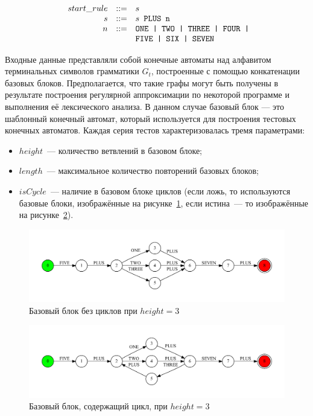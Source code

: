 $$
\begin{array}{crcl}
& start\_rule &::=& s \\
& s & ::= & s \mbox{\texttt{ PLUS }} \mbox{\texttt{n}}\\
& n & ::= & \mbox{\texttt{ONE | }} \mbox{\texttt{TWO | }} \mbox{\texttt{THREE | }} \mbox{\texttt{FOUR | }} \\
&   &     & \mbox{\texttt{FIVE | }} \mbox{\texttt{SIX | }} \mbox{\texttt{SEVEN}}
\end{array}
$$

Входные данные представляли собой конечные автоматы над алфавитом терминальных символов грамматики $G_t$, построенные с помощью конкатенации базовых блоков. Предполагается, что такие графы могут быть получены в результате построения регулярной аппроксимации по некоторой программе и выполнения её лексического анализа. В данном случае базовый блок --- это шаблонный конечный автомат, который используется для построения тестовых конечных автоматов. Каждая серия тестов характеризовалась тремя параметрами: 

\begin{itemize}
  \item $height$~--- количество ветвлений в базовом блоке;
  \item $length$~--- максимальное количество повторений базовых блоков;
  \item $isCycle$~--- наличие в базовом блоке циклов (если ложь, то используются базовые блоки, изображённые на рисунке~\ref{block}, если истина~--- то изображённые на рисунке~\ref{block_loop}).
\end{itemize}

\begin{figure}[h!]
 \centering
 \includegraphics[width=15cm]{pics/block.pdf}
 \caption{Базовый блок без циклов при $height=3$}
 \label{block}
\end{figure}

\begin{figure}[h!]
 \centering
 \includegraphics[width=15cm]{pics/block_loop.pdf}
 \caption{Базовый блок, содержащий цикл, при $height=3$}
 \label{block_loop}
\end{figure}


